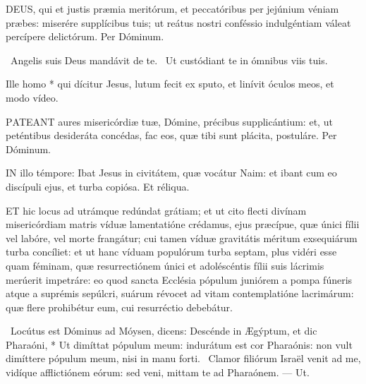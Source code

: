 
\lettrine[lines=2]{D}{EUS}, qui et justis præmia meritórum, et peccatóribus per jejúnium véniam præbes: miserére supplícibus tuis; ut reátus nostri conféssio indulgéntiam váleat percípere delictórum. Per Dóminum.

\V\ Angelis suis Deus mandávit de te. \R\ Ut custódiant te in ómnibus viis tuis.

 Ille homo * qui dícitur Jesus, lutum fecit ex sputo, et linívit óculos meos, et modo vídeo.


\lettrine[lines=2]{P}{ATEANT} aures misericórdiæ tuæ, Dómine, précibus supplicántium: et, ut peténtibus desideráta concédas, fac eos, quæ tibi sunt plácita, postuláre. Per Dóminum.

\sectionornament




\lettrine[lines=2]{I}{N} illo témpore: Ibat Jesus in civitátem, quæ vocátur Naim: et ibant cum eo discípuli ejus, et turba copiósa. Et réliqua.



\lettrine[lines=2]{E}{T} hic locus ad utrámque redúndat grátiam; et ut cito flecti divínam misericórdiam matris víduæ lamentatióne crédamus, ejus præcípue, quæ únici fílii vel labóre, vel morte frangátur; cui tamen víduæ gravitátis méritum exsequiárum turba concíliet: et ut hanc víduam populórum turba septam, plus vidéri esse quam féminam, quæ resurrectiónem únici et adoléscéntis fílii suis lácrimis merúerit impetráre: eo quod sancta Ecclésia pópulum juniórem a pompa fúneris atque a suprémis sepúlcri, suárum révocet ad vitam contemplatióne lacrimárum: quæ flere prohibétur eum, cui resurréctio debebátur.

\R\ Locútus est Dóminus ad Móysen, dicens: Descénde in Ægýptum, et dic Pharaóni, * Ut dimíttat pópulum meum: indurátum est cor Pharaónis: non vult dimíttere pópulum meum, nisi in manu forti. \V\ Clamor filiórum Israël venit ad me, vidíque afflictiónem eórum: sed veni, mittam te ad Pharaónem. --- Ut.


